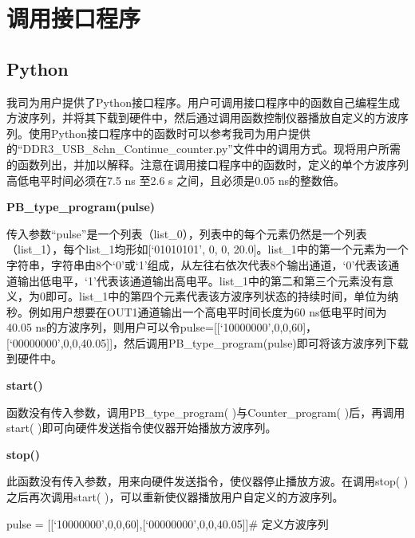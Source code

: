 \chapter{\heiti 调用接口程序}
\section{Python }
我司为用户提供了Python接口程序。用户可调用接口程序中的函数自己编程生成方波序列，并将其下载到硬件中，然后通过调用函数控制仪器播放自定义的方波序列。使用Python接口程序中的函数时可以参考我司为用户提供的“DDR3\_USB\_8chn\_Continue\_counter.py”文件中的调用方式。现将用户所需的函数列出，并加以解释。注意在调用接口程序中的函数时，定义的单个方波序列高低电平时间必须在7.5 ns 至2.6 s 之间，且必须是0.05 ns的整数倍。
\vspace{0.4cm}

\noindent\fontsize{12pt}{\baselineskip}\textbf{PB\_type\_program(pulse)}

传入参数“pulse”是一个列表（list\_0），列表中的每个元素仍然是一个列表（list\_1），每个list\_1均形如[`01010101', 0, 0, 20.0]。list\_1中的第一个元素为一个字符串，字符串由8个‘0’或‘1’组成，从左往右依次代表8个输出通道，‘0’代表该通道输出低电平，‘1’代表该通道输出高电平。list\_1中的第二和第三个元素没有意义，为0即可。list\_1中的第四个元素代表该方波序列状态的持续时间，单位为纳秒。例如用户想要在OUT1通道输出一个高电平时间长度为60 ns低电平时间为40.05 ns的方波序列，则用户可以令pulse=[[`10000000',0,0,60]， [`00000000',0,0,40.05]]，然后调用PB\_type\_program(pulse)即可将该方波序列下载到硬件中。
\vspace{0.4cm}

\noindent\fontsize{12pt}{\baselineskip}\textbf{start()}

函数没有传入参数，调用PB\_type\_program( )与Counter\_program( )后，再调用start( )即可向硬件发送指令使仪器开始播放方波序列。
\vspace{0.4cm}

\noindent\fontsize{12pt}{\baselineskip}\textbf{stop()}

此函数没有传入参数，用来向硬件发送指令，使仪器停止播放方波。在调用stop( )之后再次调用start( )，可以重新使仪器播放用户自定义的方波序列。
\vspace{0.4cm}

\noindent\fontsize{12pt}{\baselineskip}\textbf{}

pulse = [[`10000000',0,0,60],[`00000000',0,0,40.05]]\qquad  \#  定义方波序列

